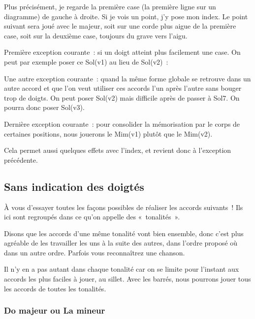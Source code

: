 \documentclass[11pt]{article}
\begin{document}
Plus précisément, je regarde la première case (la première ligne sur un
diagramme) de gauche à droite. Si je vois un point, j’y pose mon index.
Le point suivant sera joué avec le majeur, soit
sur une corde plus aigue de la première case, soit sur la deuxième case,
toujours du grave vers l’aigu.

Première exception courante~: si un doigt atteint plus facilement une case.
On peut par exemple poser ce Sol(v1) au lieu de Sol(v2)~:


Une autre exception courante~: quand la même forme globale se retrouve dans un
autre accord et que l’on veut utiliser ces accords l’un après l’autre sans
bouger trop de doigts. On peut poser Sol(v2) mais difficile après de passer à
Sol7. On pourra donc poser Sol(v3).


Dernière exception courante~: pour consolider la mémorisation par le corps de
certaines positions, nous jouerons le Mim(v1) plutôt que le Mim(v2).


Cela permet aussi quelques effets avec l’index, et revient donc à l’exception
précédente.

\subsection{Sans indication des doigtés}

À vous d’essayer toutes les façons possibles de réaliser les accords
suivants~! Ils ici sont regroupés dans ce qu’on appelle des «~tonalités~».

Disons que les accords d’une même tonalité vont bien ensemble, donc
c’est plus agréable de les travailler les uns à la suite des autres, dans
l’ordre proposé où dans un autre ordre. Parfois vous reconnaîtrez une chanson.

Il n’y en a pas autant dans chaque tonalité car on se limite pour l’instant aux
accords les plus faciles à jouer, au sillet. Avec les barrés, nous pourrons
jouer tous les accords de toutes les tonalités.

\subsubsection{Do majeur ou La mineur}
\end{document}
